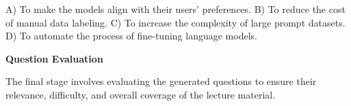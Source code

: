 {\begin{tcolorbox}[skin=widget,
		coltitle=black,
		colframe=brsu_blue!30,
		colback=brsu_blue!10,
  		adjusted title=Example multiple choice question:,
		boxrule=2mm]
	A) To make the models align with their users' preferences.\newline
	B) To reduce the cost of manual data labeling.\newline
	C) To increase the complexity of large prompt datasets.\newline
	D) To automate the process of fine-tuning language models.\newline

	\end{tcolorbox}

 	\bigbreak
	\bigbreak
	\textbf{Question Evaluation}
	
	The final stage involves evaluating the generated questions to ensure their relevance, difficulty, and overall coverage of the lecture material. 
}

